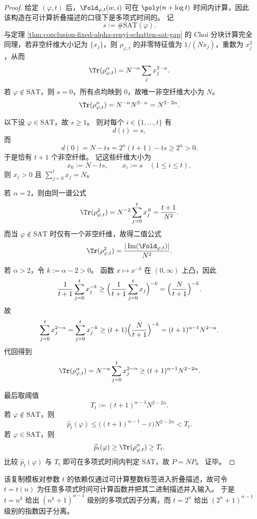\begin{proof}
给定 \((\varphi,t)\) 后，\(\Fold_{\varphi,t}(w,i)\) 可在 \(\poly(n+\log t)\) 时间内计算，因此该构造在可计算折叠描述的口径下是多项式时间的。
记
\[
s:=\#\mathrm{SAT}(\varphi).
\]
与定理 \ref{thm:conclusion-fixed-alpha-renyi-schatten-sat-gap} 的 Choi 分块计算完全同理，若非空纤维大小记为 \(\{x_j\}\)，则 \(\rho_{\varphi,t}\) 的非零特征值为 \(1/(N x_j)\)，重数为 \(x_j^2\)，从而
\[
\Tr(\rho_{\varphi,t}^\alpha)=N^{-\alpha}\sum_j x_j^{2-\alpha}.
\]
若 \(\varphi\notin\mathrm{SAT}\)，则 \(s=0\)，所有点均映到 \(0\)，故唯一非空纤维大小为 \(N\)。
\[
\Tr(\rho_{\varphi,t}^\alpha)=N^{-\alpha}N^{2-\alpha}=N^{2-2\alpha}.
\]

以下设 \(\varphi\in\mathrm{SAT}\)，故 \(s\ge 1\)。
则对每个 \(i\in\{1,\dots,t\}\) 有
\[
d(i)=s,
\]
而
\[
d(0)=N-ts=2^n(t+1)-ts\ge 2^n>0.
\]
于是恰有 \(t+1\) 个非空纤维。
记这些纤维大小为
\[
x_0:=N-ts,
\qquad
x_i:=s\quad(1\le i\le t),
\]
则 \(x_j>0\) 且 \(\sum_{j=0}^t x_j=N\)。

若 \(\alpha=2\)，则由同一谱公式
\[
\Tr(\rho_{\varphi,t}^2)
=
N^{-2}\sum_{j=0}^t x_j^{\,0}
=
\frac{t+1}{N^2}.
\]
而当 \(\varphi\notin\mathrm{SAT}\) 时仅有一个非空纤维，故得二值公式
\[
\Tr(\rho_{\varphi,t}^2)=\frac{|\operatorname{Im}(\Fold_{\varphi,t})|}{N^2}.
\]

若 \(\alpha>2\)，令 \(k:=\alpha-2>0\)。
函数 \(x\mapsto x^{-k}\) 在 \((0,\infty)\) 上凸，因此
\[
\frac{1}{t+1}\sum_{j=0}^t x_j^{-k}
\ge
\Bigl(\frac{1}{t+1}\sum_{j=0}^t x_j\Bigr)^{-k}
=
\Bigl(\frac{N}{t+1}\Bigr)^{-k}.
\]
故
\[
\sum_{j=0}^t x_j^{2-\alpha}
=
\sum_{j=0}^t x_j^{-k}
\ge
(t+1)\Bigl(\frac{N}{t+1}\Bigr)^{-k}
=
(t+1)^{\alpha-1}N^{2-\alpha}.
\]
代回得到
\[
\Tr(\rho_{\varphi,t}^\alpha)
=
N^{-\alpha}\sum_{j=0}^t x_j^{2-\alpha}
\ge
(t+1)^{\alpha-1}N^{2-2\alpha}.
\]

最后取阈值
\[
T_t:=(t+1)^{\alpha-1}N^{2-2\alpha}.
\]
若 \(\varphi\notin\mathrm{SAT}\)，则
\[
\widehat p_t(\varphi)
\le
\bigl((t+1)^{\alpha-1}-\varepsilon\bigr)N^{2-2\alpha}
<
T_t.
\]
若 \(\varphi\in\mathrm{SAT}\)，则
\[
\widehat p_t(\varphi)\ge \Tr(\rho_{\varphi,t}^\alpha)\ge T_t.
\]
比较 \(\widehat p_t(\varphi)\) 与 \(T_t\) 即可在多项式时间内判定 SAT，故 \(P=NP\)。
证毕。
\end{proof}

该复制模板对参数 \(t\) 的依赖仅通过可计算整数标签进入折叠描述，故可令 \(t=t(n)\) 为任意多项式时间可计算函数并把其二进制描述并入输入。
于是 \(t=n^k\) 给出 \((n^k+1)^{\alpha-1}\) 级别的多项式因子分离，而 \(t=2^n\) 给出 \((2^n+1)^{\alpha-1}\) 级别的指数因子分离。


